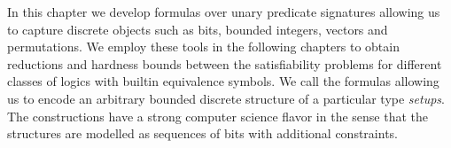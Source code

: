 In this chapter we develop formulas over unary predicate signatures allowing us
to capture discrete objects such as bits, bounded integers, vectors and
permutations.
We employ these tools in the following chapters to obtain reductions and
hardness bounds between the satisfiability problems for different classes of
logics with builtin equivalence symbols.
We call the formulas allowing us to encode an arbitrary bounded discrete
structure of a particular type \emph{setups}.
The constructions have a strong computer science flavor in the sense that the
structures are modelled as sequences of bits with additional constraints.